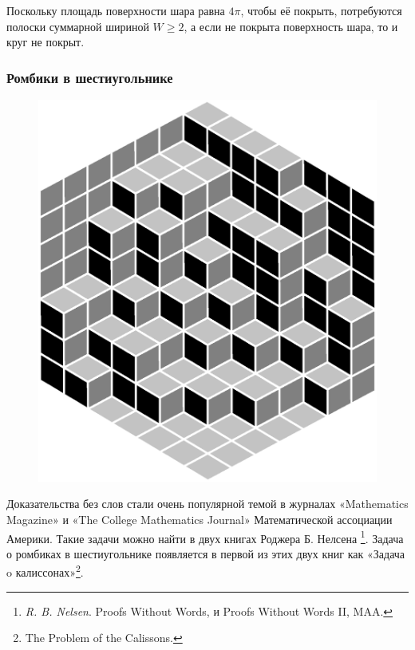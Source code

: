 \documentclass[twoside]{book}
\begin{document}
Поскольку площадь поверхности шара равна $4\pi$, чтобы её покрыть, потребуются полоски суммарной шириной $W\ge 2$,
а если не покрыта поверхность шара, то и круг не покрыт.


\subsubsection*{Ромбики в шестиугольнике}%

\leavevmode

\begin{figure}[h]
\vskip-10mm
\centering
\includegraphics[scale=0.4]{Figs/Geometry/diamonds}
\vskip-15mm
\end{figure}

\heart

Доказательства без слов стали очень популярной темой в журналах «Mathematics Magazine» и «The College Mathematics Journal» Математической ассоциации Америки.
Такие задачи можно найти в двух книгах Роджера Б. Нелсена%
\footnote{\emph{R. B. Nelsen}. {Proofs Without Words,} и {Proofs Without Words II,} MAA.}.
Задача о ромбиках в шестиугольнике появляется в первой из этих двух книг как «Задача o калиссонах»\footnote{The Problem of the Calissons.}.
\end{document}
